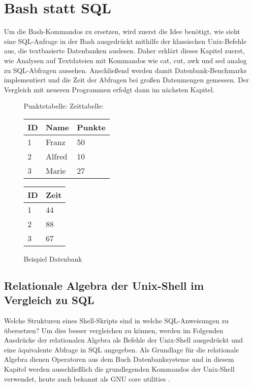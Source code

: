 
\chapter{Bash statt SQL}
Um die Bash-Kommandos zu ersetzen, wird zuerst die Idee benötigt, wie sieht eine SQL-Anfrage in der Bash ausgedrückt mithilfe der klassischen Unix-Befehle aus, die textbasierte Datenbanken auslesen. Daher erklärt dieses Kapitel zuerst, wie Analysen auf Textdateien mit Kommandos wie cat, cut, awk und sed analog zu SQL-Abfragen aussehen. Anschließend werden damit Datenbank-Benchmarks implementiert und die Zeit der Abfragen bei großen Datenmengen gemessen. Der Vergleich mit neueren Programmen erfolgt dann im nächsten Kapitel.

\begin{figure}[htb]
\centering
Punktetabelle: \hspace{6cm} Zeittabelle:\\
\begin{tabular}{p{1cm}|p{3cm}|p{1cm}}
\hline
ID & Name & Punkte \\ \hline
1 & Franz & 50 \\ \hline
2 & Alfred & 10 \\\hline
3 & Marie & 27 \\\hline
\end{tabular}
\hspace{3cm}
\begin{tabular}{p{1cm}|p{1cm}}
\hline
ID & Zeit\\ \hline
1 & 44 \\ \hline
2 & 88 \\\hline
3 & 67 \\\hline
\end{tabular}
\caption{Beispiel Datenbank}
\label{fig:bspDB}
\end{figure}

\section{Relationale Algebra der Unix-Shell im Vergleich zu SQL}
Welche Strukturen eines Shell-Skripts sind in welche SQL-Anweisungen zu übersetzen? Um dies besser vergleichen zu können, werden im Folgenden Ausdrücke der relationalen Algebra als Befehle der Unix-Shell ausgedrückt und eine äquivalente Abfrage in SQL angegeben. Als Grundlage für die relationale Algebra dienen Operatoren aus dem Buch Datenbanksysteme \cite{Kemper} und in diesem Kapitel werden ausschließlich die grundlegenden Kommandos der Unix-Shell verwendet, heute auch bekannt als GNU core utilities \cite{Gulbins}.
